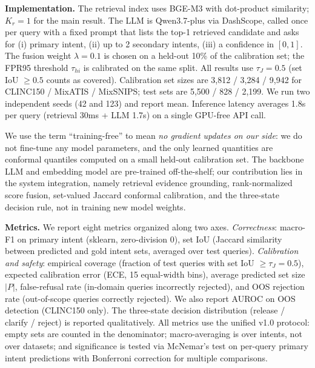 \documentclass[sigconf, anonymous, review]{acmart}
\begin{document}
\textbf{Implementation.} The retrieval index uses BGE-M3 \citep{bge} with dot-product similarity; $K_r=1$ for the main result. The LLM is Qwen3.7-plus \citep{qwen3} via DashScope, called once per query with a fixed prompt that lists the top-1 retrieved candidate and asks for (i) primary intent, (ii) up to 2 secondary intents, (iii) a confidence in $[0,1]$. The fusion weight $\lambda=0.1$ is chosen on a held-out 10\% of the calibration set; the FPR95 threshold $\tau_{hi}$ is calibrated on the same split. All results use $\tau_J=0.5$ (set IoU $\ge 0.5$ counts as covered). Calibration set sizes are 3,812 / 3,284 / 9,942 for CLINC150 / MixATIS / MixSNIPS; test sets are 5,500 / 828 / 2,199. We run two independent seeds (42 and 123) and report mean. Inference latency averages 1.8s per query (retrieval 30ms + LLM 1.7s) on a single GPU-free API call.

We use the term ``training-free'' to mean \emph{no gradient updates on our side}: we do not fine-tune any model parameters, and the only learned quantities are conformal quantiles computed on a small held-out calibration set. The backbone LLM and embedding model are pre-trained off-the-shelf; our contribution lies in the system integration, namely retrieval evidence grounding, rank-normalized score fusion, set-valued Jaccard conformal calibration, and the three-state decision rule, not in training new model weights.

\textbf{Metrics.} We report eight metrics organized along two axes. \emph{Correctness}: macro-F1 on primary intent (sklearn, zero-division 0), set IoU (Jaccard similarity between predicted and gold intent sets, averaged over test queries). \emph{Calibration and safety}: empirical coverage (fraction of test queries with set IoU $\ge \tau_J=0.5$), expected calibration error (ECE, 15 equal-width bins), average predicted set size $|P|$, false-refusal rate (in-domain queries incorrectly rejected), and OOS rejection rate (out-of-scope queries correctly rejected). We also report AUROC on OOS detection (CLINC150 only). The three-state decision distribution (release / clarify / reject) is reported qualitatively. All metrics use the unified v1.0 protocol: empty sets are counted in the denominator; macro-averaging is over intents, not over datasets; and significance is tested via McNemar's test on per-query primary intent predictions with Bonferroni correction for multiple comparisons.
\end{document}
